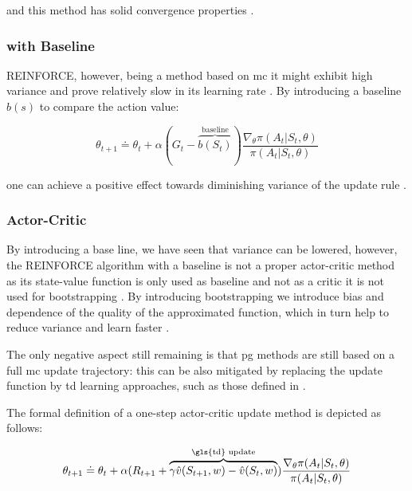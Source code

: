 \documentclass{seal_thesis}
\begin{document}
and this method has solid convergence properties \cite[p. 271]{Sutton2017}.

\subsubsection{ with Baseline}

REINFORCE, however, being a method based on \gls{mc} it might exhibit high variance and prove relatively slow in its learning rate \cite[p. 271]{Sutton2017}. By introducing a baseline $b(s)$ to compare the action value:

\begin{equation}
	\theta_{t+1} \doteq \theta_t + \alpha (G_t - \overbrace{b(S_t)}^{\text{baseline}}) \frac{\nabla_\theta \pi(A_t|S_t,\theta)}{\pi(A_t|S_t,\theta)}
\end{equation}

one can achieve a positive effect towards diminishing variance of the update rule \cite[p. 271]{Sutton2017}.

\subsubsection{Actor-Critic }

By introducing a base line, we have seen that variance can be lowered, however, the REINFORCE algorithm with a baseline is not a proper actor-critic method as its state-value function is only used as baseline and not as a critic \ie it is not used for bootstrapping \cite[p. 273]{Sutton2017}. By introducing bootstrapping we introduce bias and dependence of the quality of the approximated function, which in turn help to reduce variance and learn faster \cite[p. 273]{Sutton2017}. 

The only negative aspect still remaining is that \gls{pg} methods are still based on a full \gls{mc} update trajectory: this can be also mitigated by replacing the update function by \gls{td} learning approaches, such as those defined in  \cite[p. 273]{Sutton2017}.

The formal definition of a one-step actor-critic update method is depicted as follows:

\begin{equation}
	\theta_{t+1} \doteq \theta_t + \alpha(R_{t+1} + \overbrace{\gamma \hat{v}(S_{t+1},w)-\hat{v}(S_t,w)}^{\text{\gls{td} update}}) \frac{\nabla_\theta \pi(A_t|S_t,\theta)}{\pi(A_t|S_t,\theta)}
\end{equation}
\end{document}
